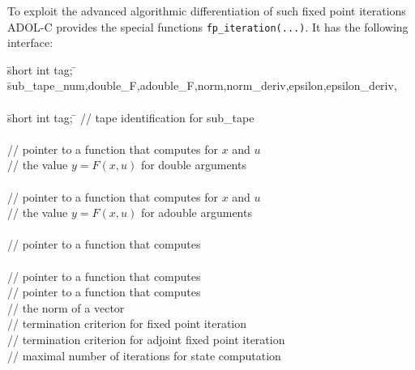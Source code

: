 \documentclass[11pt,twoside]{article}
\begin{document}
To exploit the advanced algorithmic differentiation  of such fixed point iterations
ADOL-C provides the special functions {\tt fp\_iteration(...)}.
It has the following interface: 
\begin{tabbing}
\hspace{0.5in}\={\sf short int tag;} \hspace{1.1in}\= \kill    %
\={\sf sub\_tape\_num,double\_F,adouble\_F,norm,norm\_deriv,epsilon,epsilon\_deriv,}\\
\>              \\
\hspace{0.5in}\={\sf short int tag;} \hspace{0.9in}\= \kill    %
         \> // tape identification for sub\_tape \\
     \\
\>                              \> // pointer to a function that computes for $x$ and $u$ \\
\>                              \> // the value $y=F(x,u)$ for {\sf double} arguments\\
 \\
\>                              \> // pointer to a function that computes for $x$ and $u$ \\
\>                              \> // the value $y=F(x,u)$ for {\sf adouble} arguments\\
    \\
\>                              \> // pointer to a function that computes\\
 \\
\>                              \> // pointer to a function that computes\\
       \> // pointer to a function that computes\\
\>                              \> // the norm of a vector\\
         \> // termination criterion for fixed point iteration\\
  \> // termination criterion for adjoint fixed point iteration\\
             \> // maximal number of iterations for state computation\\

\end{tabbing}
\end{document}
